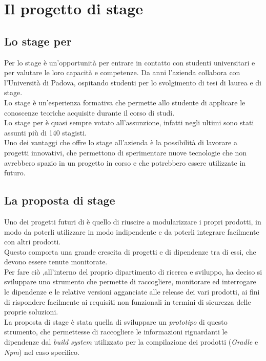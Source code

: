 \chapter{Il progetto di stage}
\label{cap:ilprogettodistage}

\section{Lo stage per \azienda}
Per \azienda lo stage è un'opportunità per entrare in contatto con studenti universitari e per valutare 
le loro capacità e competenze. Da anni l'azienda collabora con l'Università di Padova, ospitando
studenti per lo svolgimento di tesi di laurea e di stage.\\
Lo stage è un'esperienza formativa che permette allo studente di applicare le conoscenze teoriche acquisite 
durante il corso di studi.\\
Lo stage per \azienda è quasi sempre votato all'assunzione, infatti negli ultimi sono stati assunti più di 140 stagisti.\\
Uno dei vantaggi che offre lo stage all'azienda è la possibilità di lavorare a progetti innovativi, che
permettono di sperimentare nuove tecnologie che non avrebbero spazio in un progetto in corso e che potrebbero
essere utilizzate in futuro.\\

\section{La proposta di stage}
Uno dei progetti futuri di \azienda è quello di riuscire a modularizzare i propri prodotti, in modo da poterli
utilizzare in modo indipendente e da poterli integrare facilmente con altri prodotti.\\
Questo comporta una grande crescita di progetti e di dipendenze tra di essi, che devono essere tenute monitorate.\\
Per fare ciò ,\azienda all’interno del proprio dipartimento di ricerca e sviluppo, ha deciso si sviluppare uno strumento 
che permette di raccogliere, monitorare ed interrogare 
le dipendenze e le relative versioni agganciate alle release dei vari prodotti, ai fini di rispondere facilmente ai requisiti
 non funzionali in termini di sicurezza delle proprie soluzioni.\\
La proposta di stage è stata quella di sviluppare un \textit{\gls{prototipo}} di questo strumento, che permettesse di
raccogliere le informazioni riguardanti le dipendenze dal \textit{build system} utilizzato per la compilazione dei prodotti 
(\textit{\gls{Gradle}} e \textit{\gls{Npm}}) nel caso specifico.